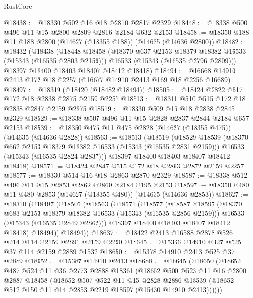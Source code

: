 \begin{lexlean}{RustCore}
\begin{coremodule}
@18438 := @18330 @502 @16 @18 @2810 @2817 @2329
@18448 := @18338 @500 @496 @11 @15 @2800 @2809 @2816 @2184 @632 @2153
@18458 := @18350 @188 @11 @188 @2800 (@14627 (@18355 @188)) (@14635 (@14636 @2800))
@18482 := @18432
    (@18438
      (@18448
        @18458
        (@18370 @637 @2153 @18379 @18382 @16533 (@15343 (@16535 @2803 @2159)))
        @16533
        (@15343 (@16535 @2796 @2809)))
      @18397
      @18400
      @18403
      @18407
      @18412
      @18418)
@18494 := @16668 @14910 @2413 @172 @18 @2257 (@16677 @14910 @2413 @169 @18 @2256 @16689)
@18497 := @18319 (@18420 (@18482 @18494))
@18505 := @18424 @2822 @517 @172 @18 @2838 @2875 @2159 @2257
@18513 := @18311 @510 @515 @172 @18 @2838 @2847 @2159 @2875
@18519 := @18330 @509 @16 @18 @2838 @2845 @2329
@18529 := @18338 @507 @496 @11 @15 @2828 @2837 @2844 @2184 @657 @2153
@18539 := @18350 @475 @11 @475 @2828 (@14627 (@18355 @475)) (@14635 (@14636 @2828))
@18563 := @18513
    (@18519
      (@18529
        @18539
        (@18370 @662 @2153 @18379 @18382 @16533 (@15343 (@16535 @2831 @2159)))
        @16533
        (@15343 (@16535 @2824 @2837)))
      @18397
      @18400
      @18403
      @18407
      @18412
      @18418)
@18571 := @18424 @2847 @515 @172 @18 @2863 @2872 @2159 @2257
@18577 := @18330 @514 @16 @18 @2863 @2870 @2329
@18587 := @18338 @512 @496 @11 @15 @2853 @2862 @2869 @2184 @195 @2153
@18597 := @18350 @480 @11 @480 @2853 (@14627 (@18355 @480)) (@14635 (@14636 @2853))
@18627 := @18310
    (@18497
      (@18505
        (@18563
          (@18571
            (@18577
              (@18587
                @18597
                (@18370 @683 @2153 @18379 @18382 @16533 (@15343 (@16535 @2856 @2159)))
                @16533
                (@15343 (@16535 @2849 @2862)))
              @18397
              @18400
              @18403
              @18407
              @18412
              @18418)
            @18494))
        @18494))
@18637 := @18422 @2413 @16588 @2878 @526 @214 @114 @2159 @2891 @2159 @2290
@18645 := @15366 @14910 @327 @525 @37 @114 @2159 @2889 @1532
@18650 := @15378 @14910 @2413 @525 @37 @2889
@18652 := @15387 @14910 @2413
@18688 := @18645
    (@18650
      (@18652
        @487
        @524
        @11
        @36
        @2773
        @2888
        @18361
        (@18652
          @500
          @523
          @11
          @16
          @2800
          @2887
          @18458
          (@18652
            @507
            @522
            @11
            @15
            @2828
            @2886
            @18539
            (@18652 @512 @150 @11 @14 @2853 @2219 @18597 (@15430 @14910 @2413))))))

\end{coremodule}
\end{lexlean}
